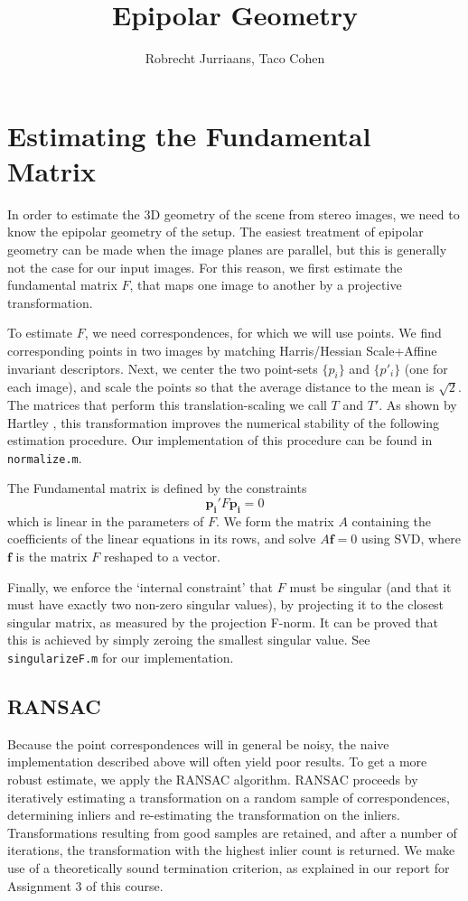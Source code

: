 \documentclass[a4paper,10pt]{article}
\title{Epipolar Geometry}
\author{Robrecht Jurriaans, Taco Cohen}
\begin{document}
\maketitle

\section{Estimating the Fundamental Matrix}
\label{sec:estF}
In order to estimate the 3D geometry of the scene from stereo images, we need to know the epipolar geometry of the setup.
The easiest treatment of epipolar geometry can be made when the image planes are parallel, but this is generally not the case for our input images.
For this reason, we first estimate the fundamental matrix $F$, that maps one image to another by a projective transformation.

To estimate $F$, we need correspondences, for which we will use points.
We find corresponding points in two images by matching Harris/Hessian Scale+Affine invariant descriptors.
Next, we center the two point-sets $\{p_i\}$ and $\{p'_i\}$ (one for each image), and scale the points so that the average distance to the mean is $\sqrt{2}$.
The matrices that perform this translation-scaling we call $T$ and $T'$.
As shown by Hartley \cite{Hartley}, this transformation improves the numerical stability of the following estimation procedure.
Our implementation of this procedure can be found in \verb+normalize.m+.

The Fundamental matrix is defined by the constraints
\begin{equation}
\mathbf{p_i'} F \mathbf{p_i} = 0
\end{equation}
which is linear in the parameters of $F$.
We form the matrix $A$ containing the coefficients of the linear equations in its rows, and solve $A \mathbf{f} = 0$ using SVD, where $\mathbf{f}$ is the matrix $F$ reshaped to a vector.

Finally, we enforce the `internal constraint' that $F$ must be singular (and that it must have exactly two non-zero singular values), by projecting it to the closest singular matrix, as measured by the projection F-norm.
It can be proved that this is achieved by simply zeroing the smallest singular value.
See \verb+singularizeF.m+ for our implementation.

\subsection{RANSAC}
Because the point correspondences will in general be noisy, the naive implementation described above will often yield poor results.
To get a more robust estimate, we apply the RANSAC algorithm.
RANSAC proceeds by iteratively estimating a transformation on a random sample of correspondences, determining inliers and re-estimating the transformation on the inliers.
Transformations resulting from good samples are retained, and after a number of iterations, the transformation with the highest inlier count is returned.
We make use of a theoretically sound termination criterion, as explained in our report for Assignment 3 of this course.
\end{document}
